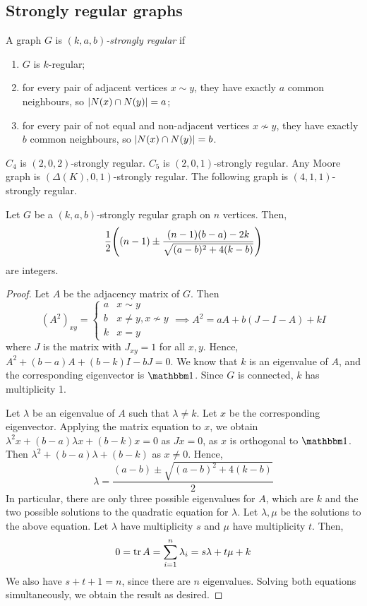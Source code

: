 \subsection{Strongly regular graphs}
\begin{definition}
	A graph \( G \) is \emph{\( (k, a, b) \)-strongly regular} if
	\begin{enumerate}
		\item \( G \) is \( k \)-regular;
		\item for every pair of adjacent vertices \( x \sim y \), they have exactly \( a \) common neighbours, so \( \abs{N(x) \cap N(y)} = a \);
		\item for every pair of not equal and non-adjacent vertices \( x \not\sim y \), they have exactly \( b \) common neighbours, so \( \abs{N(x) \cap N(y)} = b \).
	\end{enumerate}
\end{definition}
\begin{example}
	\( C_4 \) is \( (2, 0, 2) \)-strongly regular.
	\( C_5 \) is \( (2, 0, 1) \)-strongly regular.
	Any Moore graph is \( (\Delta(K), 0, 1) \)-strongly regular.
	The following graph
	is \( (4, 1, 1) \)-strongly regular.
\end{example}
\begin{theorem}
	Let \( G \) be a \( (k, a, b) \)-strongly regular graph on \( n \) vertices.
	Then,
	\[ \frac{1}{2}\qty((n-1) \pm \frac{(n-1)(b-a) - 2k}{\sqrt{(a-b)^2 + 4(k-b)}}) \]
	are integers.
\end{theorem}
\begin{proof}
	Let \( A \) be the adjacency matrix of \( G \).
	Then
	\[ (A^2)_{xy} = \begin{cases}
		a & x \sim y \\
		b & x \neq y, x \not\sim y \\
		k & x = y
	\end{cases} \implies A^2 = aA + b(J-I-A) + kI \]
	where \( J \) is the matrix with \( J_{xy} = 1 \) for all \( x, y \).
	Hence, \( A^2 + (b-a)A + (b-k)I - bJ = 0 \).
	We know that \( k \) is an eigenvalue of \( A \), and the corresponding eigenvector is \( \mathbbm 1 \).
	Since \( G \) is connected, \( k \) has multiplicity 1.

	Let \( \lambda \) be an eigenvalue of \( A \) such that \( \lambda \neq k \).
	Let \( x \) be the corresponding eigenvector.
	Applying the matrix equation to \( x \), we obtain \( \lambda^2 x + (b-a)\lambda x + (b-k)x = 0 \) as \( Jx = 0 \), as \( x \) is orthogonal to \( \mathbbm 1 \).
	Then \( \lambda^2 + (b-a)\lambda + (b-k) \) as \( x \neq 0 \).
	Hence,
	\[ \lambda = \frac{(a-b) \pm \sqrt{(a-b)^2 + 4(k-b)}}{2} \]
	In particular, there are only three possible eigenvalues for \( A \), which are \( k \) and the two possible solutions to the quadratic equation for \( \lambda \).
	Let \( \lambda, \mu \) be the solutions to the above equation.
	Let \( \lambda \) have multiplicity \( s \) and \( \mu \) have multiplicity \( t \).
	Then,
	\[ 0 = \tr A = \sum_{i=1}^n \lambda_i = s\lambda + t\mu + k \]
	We also have \( s + t + 1 = n \), since there are \( n \) eigenvalues.
	Solving both equations simultaneously, we obtain the result as desired.
\end{proof}
